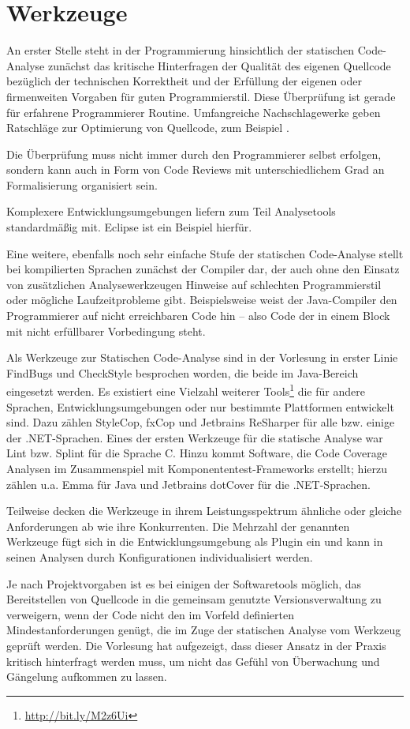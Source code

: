 \section{Werkzeuge}

An erster Stelle steht in der Programmierung hinsichtlich der statischen Code-Analyse zunächst das kritische Hinterfragen der Qualität des eigenen Quellcode bezüglich der technischen Korrektheit und der  Erfüllung der eigenen oder firmenweiten Vorgaben für guten Programmierstil. Diese Überprüfung ist gerade für erfahrene Programmierer Routine. Umfangreiche Nachschlagewerke geben Ratschläge zur Optimierung von Quellcode, zum Beispiel \cite{mcconnell2004}.

Die Überprüfung muss nicht immer durch den Programmierer selbst erfolgen, sondern kann auch in Form von Code Reviews mit unterschiedlichem Grad an Formalisierung organisiert sein. 

Komplexere Entwicklungsumgebungen liefern zum Teil Analysetools standardmäßig mit. Eclipse ist ein Beispiel hierfür.

Eine weitere, ebenfalls noch sehr einfache Stufe der statischen Code-Analyse stellt bei kompilierten Sprachen zunächst der Compiler dar, der auch ohne den Einsatz von zusätzlichen Analysewerkzeugen Hinweise auf schlechten Programmierstil oder mögliche Laufzeitprobleme gibt. Beispielsweise weist der Java-Compiler den Programmierer auf nicht erreichbaren Code hin -- also Code der in einem Block mit nicht erfüllbarer Vorbedingung steht.


Als Werkzeuge zur Statischen Code-Analyse sind in der Vorlesung in erster Linie FindBugs und CheckStyle besprochen worden, die beide im Java-Bereich eingesetzt werden. Es existiert eine Vielzahl weiterer Tools\footnote{\url{http://bit.ly/M2z6Ui}} die für andere Sprachen, Entwicklungsumgebungen oder nur bestimmte Plattformen entwickelt sind. Dazu zählen StyleCop, fxCop und Jetbrains ReSharper für alle bzw. einige der .NET-Sprachen. Eines der ersten Werkzeuge für die statische Analyse war Lint bzw. Splint für die Sprache C. Hinzu kommt Software, die  Code Coverage Analysen im Zusammenspiel mit Komponententest-Frameworks erstellt; hierzu zählen u.a. Emma für Java und Jetbrains dotCover für die .NET-Sprachen.

Teilweise decken die Werkzeuge in ihrem Leistungsspektrum ähnliche oder gleiche Anforderungen ab wie ihre Konkurrenten. Die Mehrzahl der genannten Werkzeuge fügt sich in die Entwicklungsumgebung als Plugin ein und kann in seinen Analysen durch Konfigurationen individualisiert werden.

Je nach Projektvorgaben ist es bei einigen der Softwaretools möglich, das Bereitstellen von Quellcode in die gemeinsam genutzte Versionsverwaltung zu verweigern, wenn der Code nicht den im Vorfeld definierten Mindestanforderungen genügt, die im Zuge der statischen Analyse vom Werkzeug geprüft werden. Die Vorlesung hat aufgezeigt, dass dieser Ansatz in der Praxis kritisch hinterfragt werden muss, um nicht das Gefühl von Überwachung und Gängelung aufkommen zu lassen.